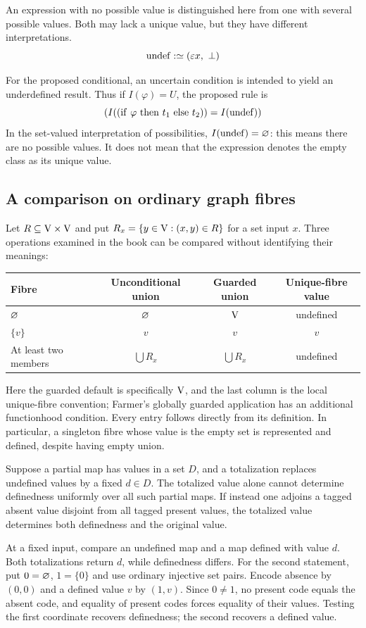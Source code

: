 \begin{definition}
An expression with no possible value is distinguished here from one with
several possible values. Both may lack a unique value, but they have
different interpretations.
\[
\mathrm{undef} :\simeq (\varepsilon x,\ \bot)
\]
\end{definition}
For the proposed conditional, an uncertain condition is intended to yield an underdefined result. Thus if $I(\varphi)=U$, the proposed rule is
\[
(I((\lif\ \varphi\ \lthen\ t_1\ \lelse\ t_2))=I(\lundef))
\]
In the set-valued interpretation of possibilities, $I(\mathrm{undef})=\varnothing$: this means there are no possible values. It does not mean that the expression denotes the empty class as its unique value.\\
\pagebreak
\subsection{A comparison on ordinary graph fibres}
Let $R\subseteq\mathrm{V}\times\mathrm{V}$ and put
$R_x=\{y\in\mathrm{V}:(x,y)\in R\}$ for a set input $x$. Three operations
examined in the book can be compared without identifying their meanings:
\begin{center}
\begin{tabular}{lccc}
Fibre & Unconditional union & Guarded union & Unique-fibre value\\
\hline
$\varnothing$ & $\varnothing$ & $\mathrm{V}$ & undefined\\
$\{v\}$ & $v$ & $v$ & $v$\\
At least two members & $\bigcup R_x$ & $\bigcup R_x$ & undefined
\end{tabular}
\end{center}
Here the guarded default is specifically $\mathrm{V}$, and the last column is
the local unique-fibre convention; Farmer's globally guarded application
has an additional functionhood condition. Every entry follows directly
from its definition. In particular, a singleton fibre whose value is the
empty set is represented and defined, despite having empty union.

\begin{proposition}
Suppose a partial map has values in a set $D$, and a totalization replaces
undefined values by a fixed $d\in D$. The totalized value alone cannot
determine definedness uniformly over all such partial maps. If instead
one adjoins a tagged absent value disjoint from all tagged present values,
the totalized value determines both definedness and the original value.
\end{proposition}
\Proof
At a fixed input, compare an undefined map and a map defined with value
$d$. Both totalizations return $d$, while definedness differs.
For the second statement, put $0=\varnothing$, $1=\{0\}$ and use
ordinary injective set pairs. Encode absence by $(0,0)$ and a defined
value $v$ by $(1,v)$. Since $0\ne1$, no present code equals the absent
code, and equality of present codes forces equality of their values.
Testing the first coordinate recovers definedness; the second recovers
a defined value.
\Done

